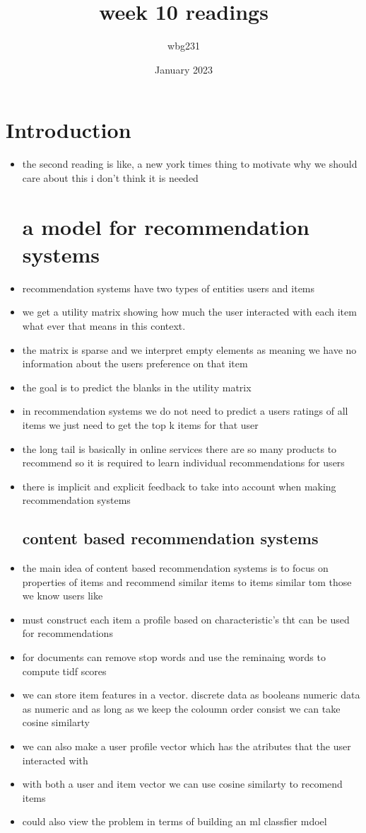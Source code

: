 \documentclass{article}
\title{week 10 readings }
\author{wbg231 }
\date{January 2023}
\begin{document}
\maketitle

\section{Introduction}
\begin{itemize}
\item the second reading is like, a new york times thing to motivate why we should care about this i don't think it is needed 
\section*{a model for recommendation systems}
\item recommendation systems have two types of entities users and items
\item we get a utility matrix showing how much the user interacted with each item what ever that means in this context. 
\item the matrix is sparse and we interpret empty elements as meaning we have no information about the users preference on that item
\item the goal is to predict the blanks in the utility matrix
\item in recommendation systems we do not need to predict a users ratings of all items we just need to get the top k items for that user 
\item the long tail is basically in online services there are so many products to recommend so it is required to learn individual recommendations for users 
\item there is implicit and explicit feedback to take into account when making recommendation systems
\subsection*{content based recommendation systems}
\item the main idea of content based recommendation systems is to focus on properties of items and recommend similar items to items similar tom those we know users like 
\item must construct each item a profile based on characteristic's tht can be used for recommendations
\item for documents can remove stop words and use the reminaing words to compute tidf scores
\item we can store item features in a vector. discrete data as booleans numeric data as numeric and as long as we keep the coloumn order consist we can take cosine similarty
\item we can also make a user profile vector which has the atributes that the user interacted with 
\item with both a user and item vector we can use cosine similarty to recomend items 
\item could also view the problem in terms of building an ml classfier mdoel 

\end{itemize}
\end{document}
